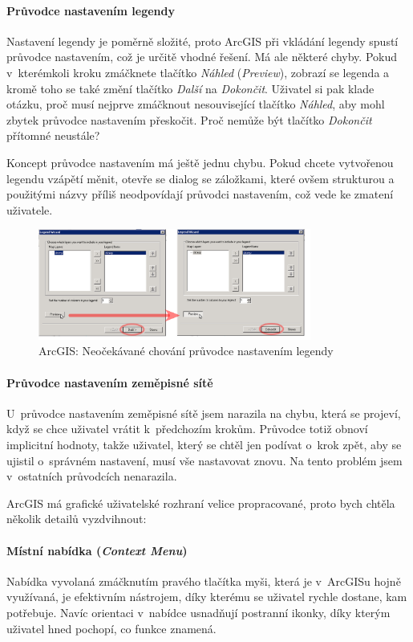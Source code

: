 \documentclass[a4paper,12pt,draft]{article}
\begin{document}
\paragraph*{Průvodce nastavením legendy}  Nastavení legendy je poměrně
složité, proto ArcGIS při vkládání legendy spustí průvodce nastavením,
což je určitě vhodné řešení. Má ale některé chyby. Pokud
v~kterémkoli kroku zmáčknete tlačítko \emph{Náhled} (\emph{Preview}),
zobrazí se legenda a kromě toho se také změní tlačítko \emph{Další}
na \emph{Dokončit}. Uživatel si pak klade otázku, proč musí nejprve
zmáčknout nesouvisející tlačítko \emph{Náhled}, aby mohl zbytek
průvodce nastavením přeskočit. Proč nemůže být tlačítko
\emph{Dokončit} přítomné neustále?

Koncept průvodce nastavením má ještě jednu chybu. Pokud chcete vytvořenou
legendu vzápětí měnit, otevře se dialog se záložkami, které ovšem
strukturou a použitými názvy příliš neodpovídají průvodci nastavením,
což vede ke zmatení uživatele.

\begin{figure}[h!]
\centering
\includegraphics[width=0.8\textwidth]{./GUI_screenshots/ArcGIS_legend_wizard.png}
\caption{ArcGIS: Neočekávané chování průvodce nastavením legendy}
\label{fig:ArcGIS_legend_wizard}
\end{figure}


\paragraph*{Průvodce nastavením zeměpisné sítě}
U~průvodce nastavením zeměpisné sítě jsem narazila na chybu, která se
projeví, když se chce uživatel vrátit k~předchozím krokům. Průvodce
totiž obnoví implicitní hodnoty, takže uživatel, který se chtěl jen
podívat o~krok zpět, aby se ujistil o~správném nastavení, musí vše
nastavovat znovu. Na tento problém jsem v~ostatních průvodcích nenarazila.

ArcGIS má grafické uživatelské rozhraní velice propracované, proto
bych chtěla několik detailů vyzdvihnout:
\paragraph*{Místní nabídka (\emph{Context Menu})}
Nabídka vyvolaná zmáčknutím pravého tla\-čítka myši, která je v~ArcGISu
hojně využívaná, je efektivním nástrojem, díky kterému se uživatel
rychle dostane, kam potřebuje. Navíc orientaci v~nabídce usnad\-ňují
postranní ikonky, díky kterým uživatel hned pochopí, co funkce znamená.
\end{document}
